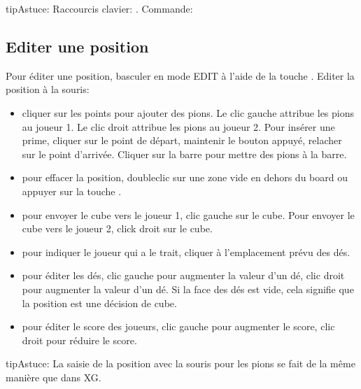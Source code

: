 \documentclass[letterpaper,10pt,french]{sphinxmanual}
\begin{document}
\begin{sphinxadmonition}{tip}{Astuce:}
\sphinxAtStartPar
Raccourcis clavier: . Commande: 
\end{sphinxadmonition}


\subsection{Editer une position}
\label{\detokenize{guide_utilisateur:editer-une-position}}\label{\detokenize{guide_utilisateur:guide-edit-position}}
\sphinxAtStartPar
Pour éditer une position, basculer en mode EDIT à l’aide de la touche .
Editer la position à la souris:
\begin{itemize}
\item {} 
\sphinxAtStartPar
cliquer sur les points pour ajouter des pions. Le clic gauche attribue les
pions au joueur 1. Le clic droit attribue les pions au joueur 2. Pour insérer
une prime, cliquer sur le point de départ, maintenir le bouton appuyé,
relacher sur le point d’arrivée. Cliquer sur la barre pour mettre des
pions à la barre.

\item {} 
\sphinxAtStartPar
pour effacer la position, double\sphinxhyphen{}clic sur une zone vide en dehors du board ou
appuyer sur la touche .

\item {} 
\sphinxAtStartPar
pour envoyer le cube vers le joueur 1, clic gauche sur le cube. Pour envoyer
le cube vers le joueur 2, click droit sur le cube.

\item {} 
\sphinxAtStartPar
pour indiquer le joueur qui a le trait, cliquer à l’emplacement prévu des dés.

\item {} 
\sphinxAtStartPar
pour éditer les dés, clic gauche pour augmenter la valeur d’un dé, clic droit
pour augmenter la valeur d’un dé. Si la face des dés est vide, cela signifie
que la position est une décision de cube.

\item {} 
\sphinxAtStartPar
pour éditer le score des joueurs, clic gauche pour augmenter le score, clic
droit pour réduire le score.

\end{itemize}

\begin{sphinxadmonition}{tip}{Astuce:}
\sphinxAtStartPar
La saisie de la position avec la souris pour les pions se fait de la
même manière que dans XG.
\end{sphinxadmonition}
\end{document}

